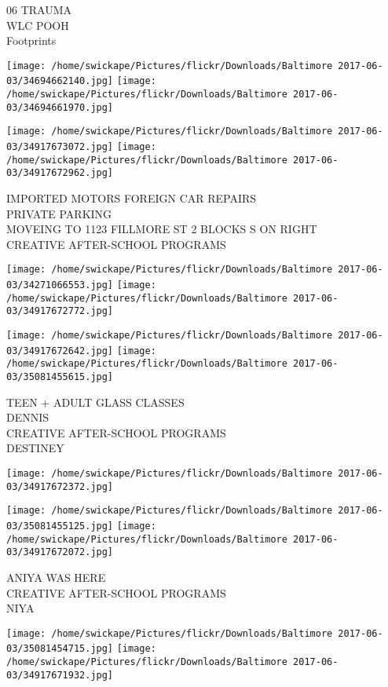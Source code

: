 \documentclass[10pt,letterpaper]{article}
\begin{document}
06 TRAUMA\\
WLC POOH\\
Footprints
\pagebreak

\texttt{[image: /home/swickape/Pictures/flickr/Downloads/Baltimore 2017-06-03/34694662140.jpg]}
\texttt{[image: /home/swickape/Pictures/flickr/Downloads/Baltimore 2017-06-03/34694661970.jpg]}

\texttt{[image: /home/swickape/Pictures/flickr/Downloads/Baltimore 2017-06-03/34917673072.jpg]}
\texttt{[image: /home/swickape/Pictures/flickr/Downloads/Baltimore 2017-06-03/34917672962.jpg]}

IMPORTED MOTORS FOREIGN CAR REPAIRS\\
PRIVATE PARKING\\
MOVEING TO 1123 FILLMORE ST 2 BLOCKS S ON RIGHT\\
CREATIVE AFTER{-}SCHOOL PROGRAMS
\pagebreak

\texttt{[image: /home/swickape/Pictures/flickr/Downloads/Baltimore 2017-06-03/34271066553.jpg]}
\texttt{[image: /home/swickape/Pictures/flickr/Downloads/Baltimore 2017-06-03/34917672772.jpg]}

\texttt{[image: /home/swickape/Pictures/flickr/Downloads/Baltimore 2017-06-03/34917672642.jpg]}
\texttt{[image: /home/swickape/Pictures/flickr/Downloads/Baltimore 2017-06-03/35081455615.jpg]}

TEEN + ADULT GLASS CLASSES\\
DENNIS\\
CREATIVE AFTER{-}SCHOOL PROGRAMS\\
DESTINEY
\pagebreak

\texttt{[image: /home/swickape/Pictures/flickr/Downloads/Baltimore 2017-06-03/34917672372.jpg]}

\vspace{0.25in}
\texttt{[image: /home/swickape/Pictures/flickr/Downloads/Baltimore 2017-06-03/35081455125.jpg]}
\texttt{[image: /home/swickape/Pictures/flickr/Downloads/Baltimore 2017-06-03/34917672072.jpg]}

ANIYA WAS HERE\\
CREATIVE AFTER{-}SCHOOL PROGRAMS\\
NIYA
\pagebreak

\texttt{[image: /home/swickape/Pictures/flickr/Downloads/Baltimore 2017-06-03/35081454715.jpg]}
\texttt{[image: /home/swickape/Pictures/flickr/Downloads/Baltimore 2017-06-03/34917671932.jpg]}
\end{document}
